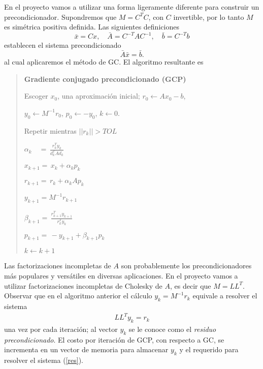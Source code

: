 \documentclass[12pt]{article}
\begin{document}
 En el proyecto vamos a utilizar una forma ligeramente diferente para construir un precondicionador. Supondremos que $M = C^TC$, con $C$ invertible, por lo tanto $M$ es sim\'etrica positiva definida. Las siguientes definiciones 
 \[
     \bar{x} = Cx, \quad   \bar{A} = C^{-T}AC^{-1}, \quad \bar{b} = C^{-T}b
 \]
 establecen el sistema precondicionado 
 \[
    \bar{A} \bar{x} = \bar{ b}.
 \]
 al cual aplicaremos el m\'etodo de GC. El algoritmo resultante es
 
\begin{quotation}
\begin{description}
 \item 
 \item {\bf Gradiente conjugado precondicionado (GCP) }  
 \item
 \item Escoger $x_0$, una aproximaci\'on inicial; \quad  $r_0 \leftarrow Ax_0 - b$, 
 \item $y_0 \leftarrow M^{-1}r_0$, \quad  $p_0 \leftarrow -y_0$,  \quad $k \leftarrow 0$.
 \item Repetir mientras $||r_k|| > TOL$
  \begin{description}
    \item $\displaystyle \alpha_k  \quad = \, \frac{r_k^Ty_k}{d_k^TAd_k}$
    \item  $x_{k+1} = \, x_k + \alpha_k p_k$
    \item $r_{k+1}  = \, r_k + \alpha_k Ap_k$
    \item $y_{k+1} = M^{-1}r_{k+1}$
    \item $\displaystyle \beta_{k+1} = \, \frac{r_{k+1}^Ty_{k+1}}{r_k^Ty_k}$
    \item $p_{k+1} = \, -y_{k+1} + \beta_{k+1}p_k$
    \item $k \leftarrow k + 1$
  \end{description}
\end{description}
\end{quotation}

Las factorizaciones incompletas de $A$ son probablemente los precondicionadores m\'as populares y vers\'atiles en diversas aplicaciones. En el proyecto vamos a utilizar factorizaciones incompletas de Cholesky de $A$,  es decir que $M = LL^T$. Observar que en el algoritmo anterior el c\'alculo $y_k = M^{-1}r_k$ equivale a resolver el sistema
\begin{eqnarray}  \label{res}
    LL^T y_k = r_k
\end{eqnarray}
una vez por cada iteraci\'on; al vector $y_{k}$ se le conoce como el {\em residuo precondicionado}. El costo por iteraci\'on de GCP, con respecto a GC, se incrementa en un vector de memoria para almacenar $y_k$ y el requerido para resolver el sistema (\ref{res}).
\end{document}
